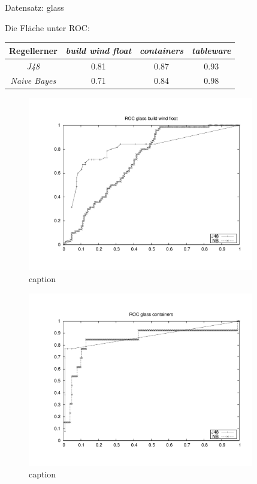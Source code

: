 Datensatz: glass

Die Fl\"ache unter ROC:

\begin{tabular}{c|c|c|c}
				Regellerner       & \emph{build wind float} & \emph{containers} & \emph{tableware}  \\ \hline
				\emph{J48}			& 0.81 & 0.87 & 0.93  \\ \hline
				\emph{Naive Bayes}  & 0.71 & 0.84 & 0.98  
\end{tabular}
\begin{figure}[htbp]
	\centering
		\includegraphics[height=3in]{pics/a3/ROC_glass_build_wind_float.pdf}
	\caption{caption}
	\label{fig:pics_a3_ROC_glass_build_wind_float}
\end{figure}

\begin{figure}[htbp]
	\centering
		\includegraphics[height=3in]{pics/a3/ROC_glass_containers.pdf}
	\caption{caption}
	\label{fig:pics_a3_ROC_glass_containers}
\end{figure}


